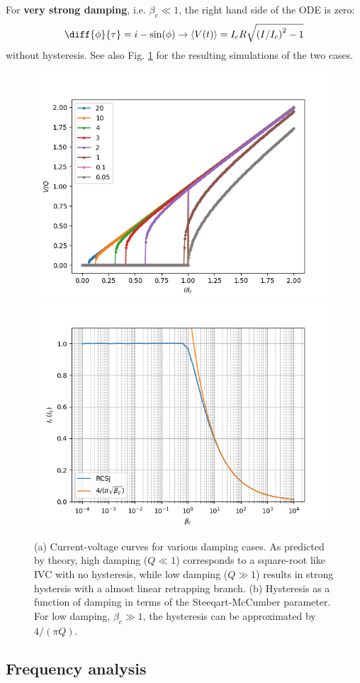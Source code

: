 \documentclass[reprint,onecolumn,%
amsmath,amssymb,aip,apl]{revtex4-1}
\begin{document}
	For \textbf{very strong damping}, i.e. $\beta_c\ll1$, the right hand side of the ODE is zero:
	\begin{eqnarray}
	\diff{\phi}{\tau}=i-\sin(\phi) \rightarrow \langle V(t) \rangle=I_c R\sqrt{\left(I/I_c\right)^2-1}
	\end{eqnarray}
	without hysteresis.
	See also Fig. \ref{fig:hysteresis} for the resulting simulations of the two cases.
	
	
	\begin{figure}
		\centering
		\includegraphics[width=0.49\linewidth]{figs/ivcs_updown}\hfill
		\includegraphics[width=0.49\linewidth]{figs/hysteresis_loglin}
		\caption{(a) Current-voltage curves for various damping cases.
			As predicted by theory, high damping ($Q\ll1$) corresponds to a square-root like IVC with no hysteresis, while low damping ($Q\gg1$) results in strong hystersis with a almost linear retrapping branch. (b) Hysteresis as a function of damping in terms of the Steeqart-McCumber parameter. For low damping, $\beta_c\gg1$, the hysteresis can be approximated by $4/(\pi Q)$.}
		\label{fig:hysteresis}
	\end{figure}
	
	\subsection{Frequency analysis}
	
	
\end{document}
